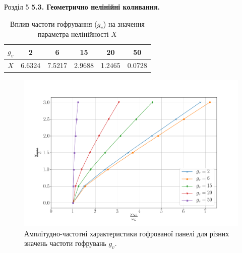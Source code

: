 \documentclass[8pt]{beamer}
\numberwithin{figure}{section}
\numberwithin{equation}{section}
\numberwithin{table}{section}
\begin{document}
\begin{frame}{Розділ 5}
\textbf{5.3. Геометрично нелінійні коливання.}

\begin{table}[h!]
\caption{Вплив частоти гофрування ($g_v$) на значення параметра нелінійності $X$}
\centering
 \begin{tabular}{| c | c | c | c | c | c |} 
 \hline
 $g_v$ & 2 & 6 & 15 & 20 & 50 \\ 
  \hline
 $X$ & 6.6324 & 7.5217 & 2.9688 & 1.2465 & 0.0728 \\
   \hline
\end{tabular}
\end{table}

\begin{figure}
	\includegraphics[scale=0.23]{pic/corrugated_nonlinear.png}
		\caption{Амплітудно-частотні характеристики гофрованої панелі для різних значень частоти гофрувань $g_v$.}
\end{figure}

\end{frame}
\end{document}
